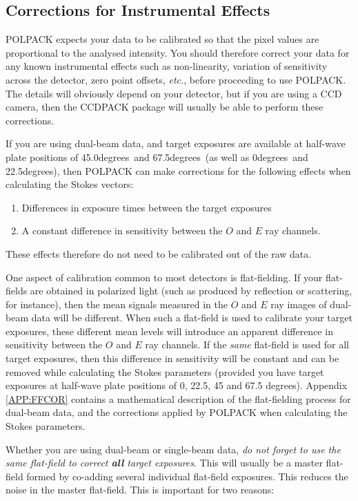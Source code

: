 \documentclass[twoside,11pt]{article}
\newcommand{\hyperref}[4]{#2\ref{#4}#3}
\newcommand{\xref}[3]{#1}
\renewcommand{\_}{\texttt{\symbol{95}}}
\newcommand{\dgs}{\hbox{$^\circ$}}
\renewcommand{\dgs}{degrees}
\begin{document}
\subsection{\label{SEC:CCDPACK}Corrections for Instrumental Effects}
POLPACK expects your data to be calibrated so that the pixel values are
proportional to the analysed intensity. You should therefore correct your
data for any known instrumental effects such as non-linearity, variation
of sensitivity across the detector, zero point offsets, \emph{etc.}, before
proceeding to use POLPACK. The details will obviously depend on your
detector, but if you are using a CCD camera, then the \xref{CCDPACK}{sun139}{} 
package  will usually be able to perform these corrections.

If you are using dual-beam data, and target exposures are available at 
half-wave plate positions of
45.0\dgs\ and 67.5\dgs\ (as well as 0\dgs\ and 22.5\dgs), then POLPACK can
make corrections for the following effects when calculating the Stokes
vectors:

\begin{enumerate}
\item Differences in exposure times between the target exposures
\item A constant difference in sensitivity between the $O$ and $E$ ray
channels.
\end{enumerate}

These effects therefore do not need to be calibrated out of the raw data.

One aspect of calibration common to most detectors is flat-fielding. If
your flat-fields are obtained in polarized light (such as produced by
reflection or scattering, for instance), then the mean signals measured
in the $O$ and $E$ ray images of dual-beam data will be different. When 
such a flat-field
is used to calibrate your target exposures, these different mean levels
will introduce an apparent difference in sensitivity between the $O$ and
$E$ ray channels. If the \emph{same} flat-field is used for all target
exposures, then this difference in sensitivity will be constant and can
be removed while calculating the Stokes parameters (provided you have
target exposures at half-wave plate positions of 0, 22.5, 45 and 67.5
degrees). \hyperref{Go here for}{Appendix }{ contains}{APP:FFCOR} a
mathematical description of the flat-fielding process for dual-beam data, 
and the corrections applied by POLPACK when calculating the Stokes parameters.

Whether you are using dual-beam or single-beam data, \emph{do not forget to
use the same flat-field to correct \textbf{all} target exposures}. This
will usually be a master flat-field formed by co-adding several
individual flat-field exposures. This reduces the noise in the master
flat-field. This is important for two reasons:
\end{document}

